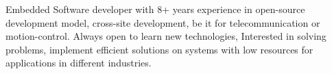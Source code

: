 

\begin{cvparagraph}

Embedded Software developer with 8+ years experience in open-source development model, cross-site development, be it for telecommunication or motion-control. Always open to learn new technologies, Interested in solving problems, implement efficient solutions on systems with low resources for applications in different industries.
\end{cvparagraph}
